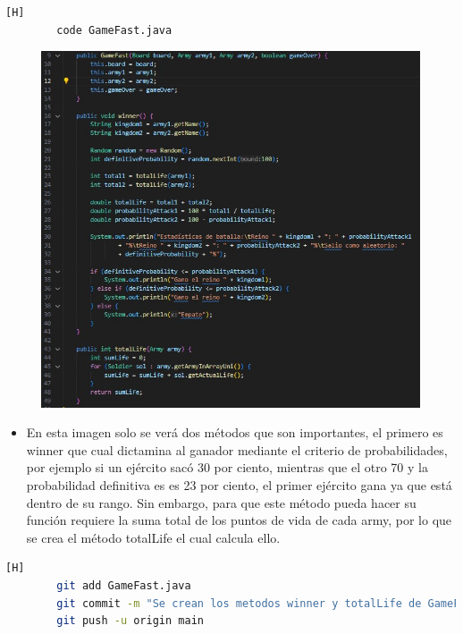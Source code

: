 \documentclass{article}
\begin{document}
	\begin{lstlisting}[language=bash,caption={Se crea la clase que gestiona el juego}][H]
		code GameFast.java
	\end{lstlisting}
	\begin{figure}[H]
		\centering
		\includegraphics[width=1\textwidth,keepaspectratio]{img/gameFast.jpg}
	\end{figure}
	\begin{itemize}	
		\item En esta imagen solo se verá dos métodos que son importantes, el primero es winner que cual dictamina al ganador mediante el criterio de probabilidades, por ejemplo si un ejército sacó 30 por ciento, mientras que el otro 70 y la probabilidad definitiva es es 23 por ciento, el primer ejército gana ya que está dentro de su rango. Sin embargo, para que este método pueda hacer su función requiere la suma total de los puntos de vida de cada army, por lo que se crea el método totalLife el cual calcula ello. 
	\end{itemize}	
	\begin{lstlisting}[language=bash,caption={Commit: 289acd859314fecd76473faa1f7adbae3f3de7c0 }][H]
		git add GameFast.java
		git commit -m "Se crean los metodos winner y totalLife de GameFast"			
		git push -u origin main
	\end{lstlisting}
	
\end{document}
